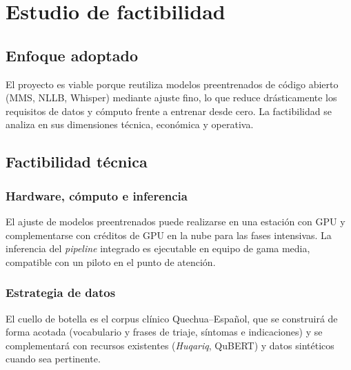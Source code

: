 \clearpage
\section{Estudio de factibilidad}

\subsection{Enfoque adoptado}
El proyecto es viable porque reutiliza modelos preentrenados de c{\'o}digo abierto (MMS, NLLB,
Whisper) mediante ajuste fino, lo que reduce dr{\'a}sticamente los requisitos de datos y c{\'o}mputo
frente a entrenar desde cero. La factibilidad se analiza en sus dimensiones t{\'e}cnica,
econ{\'o}mica y operativa.

\subsection{Factibilidad t{\'e}cnica}

\subsubsection{Hardware, c{\'o}mputo e inferencia}
El ajuste de modelos preentrenados puede realizarse en una estaci{\'o}n con GPU y complementarse con
cr{\'e}ditos de GPU en la nube para las fases intensivas. La inferencia del \emph{pipeline} integrado
es ejecutable en equipo de gama media, compatible con un piloto en el punto de atenci{\'o}n.

\subsubsection{Estrategia de datos}
El cuello de botella es el corpus cl{\'i}nico Quechua--Espa{\~n}ol, que se construir{\'a} de forma
acotada (vocabulario y frases de triaje, s{\'i}ntomas e indicaciones) y se complementar{\'a} con
recursos existentes (\emph{Huqariq}, QuBERT) y datos sint{\'e}ticos cuando sea pertinente.

